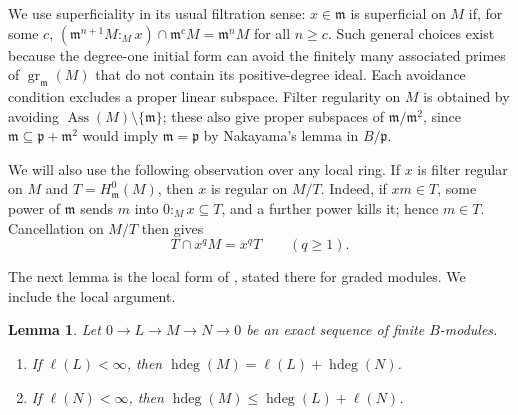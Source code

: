 \documentclass[11pt,reqno]{amsart}
\numberwithin{equation}{section}
\newtheorem{lemma}[theorem]{Lemma}
\theoremstyle{definition}
\newcommand{\m}{\mathfrak m}
\newcommand{\hdeg}{\operatorname{hdeg}}
\newcommand{\Ass}{\operatorname{Ass}}
\begin{document}
We use superficiality in its usual filtration sense: $x\in\m$
is superficial on $M$ if, for some $c$,
$(\m^{n+1}M:_M x)\cap\m^cM=\m^nM$ for all $n\geq c$.
Such general choices exist because the degree-one initial form
can avoid the finitely many associated primes of
$\operatorname{gr}_{\m}(M)$ that do not contain its positive-degree
ideal. Each avoidance condition excludes a proper linear subspace.
Filter regularity on $M$ is obtained by avoiding
$\Ass(M)\setminus\{\m\}$; these also give proper subspaces of
$\m/\m^2$, since $\m\subseteq\mathfrak p+\m^2$ would imply
$\m=\mathfrak p$ by Nakayama's lemma in $B/\mathfrak p$.

We will also use the following observation over any local ring.
If $x$ is filter regular on $M$ and $T=H^0_{\m}(M)$, then $x$
is regular on $M/T$. Indeed, if $xm\in T$, some power of $\m$
sends $m$ into $0:_Mx\subseteq T$, and a further power kills it;
hence $m\in T$. Cancellation on $M/T$ then gives
\begin{equation}\label{eq:filter-regular-torsion}
 T\cap x^qM=x^qT\qquad(q\geq1).
\end{equation}

The next lemma is the local form of
\cite[Proposition~2.14]{Vasconcelos1998}, stated there for graded
modules. We include the local argument.

\begin{lemma}
\label{lem:hdeg-finite-length}
Let $0\longrightarrow L\longrightarrow M\longrightarrow N
\longrightarrow0$ be an exact sequence of finite $B$-modules.
\begin{enumerate}
 \item If $\ell(L)<\infty$, then
       $\hdeg(M)=\ell(L)+\hdeg(N)$.
 \item If $\ell(N)<\infty$, then
       $\hdeg(M)\leq\hdeg(L)+\ell(N)$.
\end{enumerate}
\end{lemma}
\end{document}

